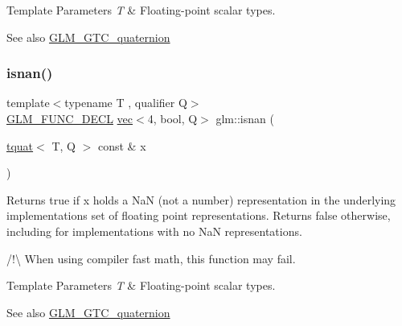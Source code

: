 \begin{DoxyTemplParams}{Template Parameters}
{\em T} & Floating-\/point scalar types.\\
\hline
\end{DoxyTemplParams}
\begin{DoxySeeAlso}{See also}
\mbox{\hyperlink{group__gtc__quaternion}{G\+L\+M\+\_\+\+G\+T\+C\+\_\+quaternion}} 
\end{DoxySeeAlso}
\mbox{\label{group__gtc__quaternion_ga31f4378ab97985177e208f4f4f8b1fd3}} 
\subsubsection{\texorpdfstring{isnan()}{isnan()}}
{\footnotesize\ttfamily template$<$typename T , qualifier Q$>$ \\
\mbox{\hyperlink{setup_8hpp_ab2d052de21a70539923e9bcbf6e83a51}{G\+L\+M\+\_\+\+F\+U\+N\+C\+\_\+\+D\+E\+CL}} \mbox{\hyperlink{structglm_1_1vec}{vec}}$<$4, bool, Q$>$ glm\+::isnan (\begin{DoxyParamCaption}\item[{\mbox{\hyperlink{structglm_1_1tquat}{tquat}}$<$ T, Q $>$ const \&}]{x }\end{DoxyParamCaption})}

Returns true if x holds a NaN (not a number) representation in the underlying implementation\textquotesingle{}s set of floating point representations. Returns false otherwise, including for implementations with no NaN representations.

/!\textbackslash{} When using compiler fast math, this function may fail.


\begin{DoxyTemplParams}{Template Parameters}
{\em T} & Floating-\/point scalar types.\\
\hline
\end{DoxyTemplParams}
\begin{DoxySeeAlso}{See also}
\mbox{\hyperlink{group__gtc__quaternion}{G\+L\+M\+\_\+\+G\+T\+C\+\_\+quaternion}} 
\end{DoxySeeAlso}
\mbox{\label{group__gtc__quaternion_gab33f82f8d1c9223d335aab752a126855}} 
